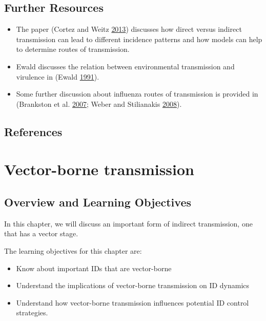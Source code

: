 \documentclass[]{book}
\providecommand{\tightlist}{%
  \setlength{\itemsep}{0pt}\setlength{\parskip}{0pt}}
\theoremstyle{definition}
\theoremstyle{definition}
\theoremstyle{definition}
\theoremstyle{remark}
\begin{document}
\section{Further Resources}\label{further-resources-6}

\begin{itemize}
\tightlist
\item
  The paper (Cortez and Weitz \protect\hyperlink{ref-cortez13}{2013})
  discusses how direct versus indirect transmission can lead to
  different incidence patterns and how models can help to determine
  routes of transmission.
\item
  Ewald discusses the relation between environmental transmission and
  virulence in (Ewald \protect\hyperlink{ref-ewald91}{1991}).
\item
  Some further discussion about influenza routes of transmission is
  provided in (Brankston et al.
  \protect\hyperlink{ref-brankston07}{2007}; Weber and Stilianakis
  \protect\hyperlink{ref-weber08}{2008}).
\end{itemize}

\section{References}\label{references-7}

\chapter{Vector-borne transmission}\label{vector-borne-transmission-1}

\section{Overview and Learning
Objectives}\label{overview-and-learning-objectives-7}

In this chapter, we will discuss an important form of indirect
transmission, one that has a vector stage.

The learning objectives for this chapter are:

\begin{itemize}
\tightlist
\item
  Know about important IDs that are vector-borne
\item
  Understand the implications of vector-borne transmission on ID
  dynamics
\item
  Understand how vector-borne transmission influences potential ID
  control strategies.
\end{itemize}
\end{document}
